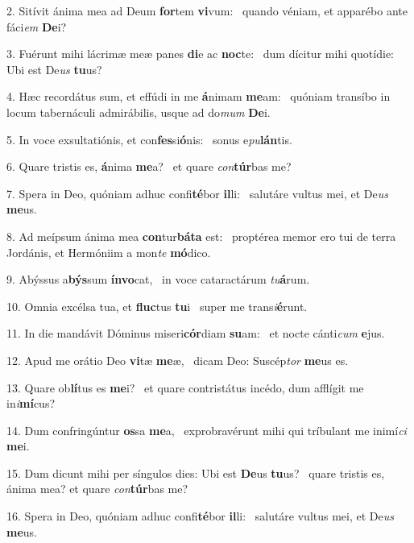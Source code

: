 2. Sitívit ánima mea ad Deum \textbf{for}tem \textbf{vi}vum: \ast\  quando véniam, et apparébo ante fáci\textit{em} \textbf{De}i?\

3. Fuérunt mihi lácrimæ meæ panes \textbf{di}e ac \textbf{noc}te: \ast\  dum dícitur mihi quotídie: Ubi est De\textit{us} \textbf{tu}us?\

4. Hæc recordátus sum, et effúdi in me \textbf{á}nimam \textbf{me}am: \ast\  quóniam transíbo in locum tabernáculi admirábilis, usque ad do\textit{mum} \textbf{De}i.\

5. In voce exsultatiónis, et con\textbf{fes}si\textbf{ó}nis: \ast\  sonus e\textit{pu}\textbf{lán}tis.\

6. Quare tristis es, \textbf{á}nima \textbf{me}a? \ast\  et quare \textit{con}\textbf{túr}bas me?\

7. Spera in Deo, quóniam adhuc confi\textbf{té}bor \textbf{il}li: \ast\  salutáre vultus mei, et De\textit{us} \textbf{me}us.\

8. Ad meípsum ánima mea \textbf{con}tur\textbf{bá}\textbf{ta} est: \ast\  proptérea memor ero tui de terra Jordánis, et Hermóniim a mon\textit{te} \textbf{mó}dico.\

9. Abýssus a\textbf{býs}sum \textbf{ín}\textbf{vo}cat, \ast\  in voce cataractárum \textit{tu}\textbf{á}rum.\

10. Omnia excélsa tua, et \textbf{fluc}tus \textbf{tu}i \ast\  super me trans\textit{i}\textbf{é}runt.\

11. In die mandávit Dóminus miseri\textbf{cór}diam \textbf{su}am: \ast\  et nocte cánti\textit{cum} \textbf{e}jus.\

12. Apud me orátio Deo \textbf{vi}tæ \textbf{me}æ, \ast\  dicam Deo: Suscép\textit{tor} \textbf{me}us es.\

13. Quare ob\textbf{lí}tus es \textbf{me}i? \ast\  et quare contristátus incédo, dum afflígit me in\textit{i}\textbf{mí}cus?\

14. Dum confringúntur \textbf{os}sa \textbf{me}a, \ast\  exprobravérunt mihi qui tríbulant me inimí\textit{ci} \textbf{me}i.\

15. Dum dicunt mihi per síngulos dies: Ubi est \textbf{De}us \textbf{tu}us? \ast\  quare tristis es, ánima mea? et quare \textit{con}\textbf{túr}bas me?\

16. Spera in Deo, quóniam adhuc confi\textbf{té}bor \textbf{il}li: \ast\  salutáre vultus mei, et De\textit{us} \textbf{me}us.\

